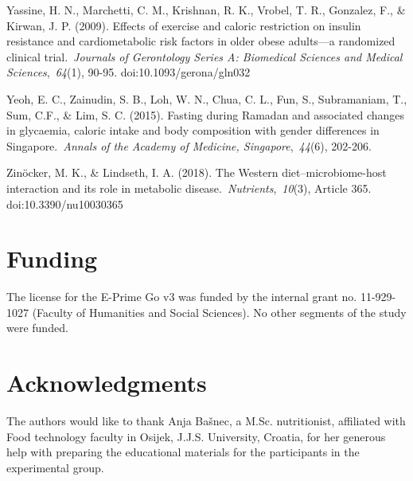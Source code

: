 \documentclass[authordate, empirical]{jote-new-article}
\begin{document}
Yassine, H. N., Marchetti, C. M., Krishnan, R. K., Vrobel, T. R., Gonzalez, F., \& Kirwan, J. P. (2009). Effects of exercise and caloric restriction on insulin resistance and cardiometabolic risk factors in older obese adults—a randomized clinical trial. \emph{Journals of Gerontology Series A: Biomedical Sciences and Medical Sciences}, \emph{64}(1), 90-95. doi:10.1093/gerona/gln032



Yeoh, E. C., Zainudin, S. B., Loh, W. N., Chua, C. L., Fun, S., Subramaniam, T., Sum, C.F., \& Lim, S. C. (2015). Fasting during Ramadan and associated changes in glycaemia, caloric intake and body composition with gender differences in Singapore. \emph{Annals of the Academy of Medicine, Singapore}, \emph{44}(6), 202-206.



Zinöcker, M. K., \& Lindseth, I. A. (2018). The Western diet--microbiome-host interaction and its role in metabolic disease. \emph{Nutrients}, \emph{10}(3), Article 365. doi:10.3390/nu10030365











\section{Funding}



The license for the E-Prime Go v3 was funded by the internal grant no. 11-929-1027 (Faculty of Humanities and Social Sciences). No other segments of the study were funded.



\section{Acknowledgments}



The authors would like to thank Anja Bašnec, a M.Sc. nutritionist, affiliated with Food technology faculty in Osijek, J.J.S. University, Croatia, for her generous help with preparing the educational materials for the participants in the experimental group.
\end{document}
